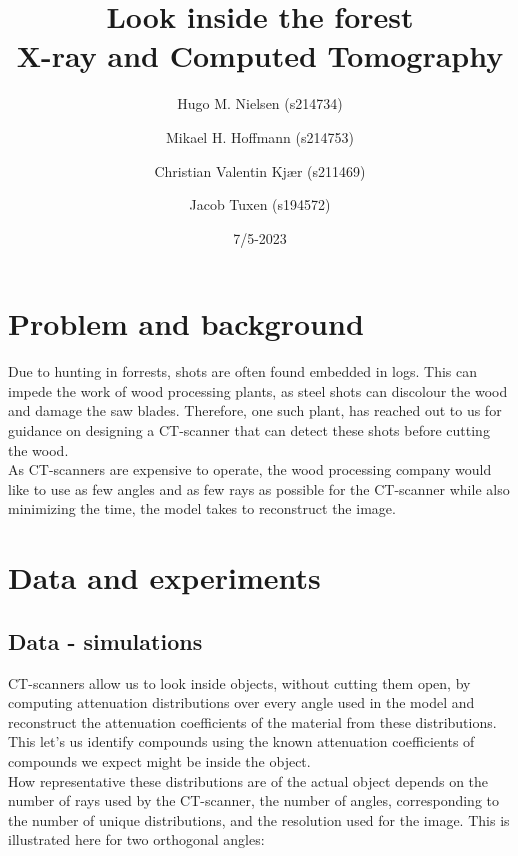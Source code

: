 \documentclass{article}
\title{
    Look inside the forest \\
    \large X-ray and Computed Tomography
}
\author{Hugo M. Nielsen (s214734) \and Mikael H. Hoffmann (s214753) \and Christian Valentin Kjær (s211469) \and Jacob Tuxen (s194572)}
\date{7/5-2023}
\begin{document}
\maketitle


\section{Problem and background} 
Due to hunting in forrests, shots are often found embedded in logs. This can impede the work of wood processing plants, as steel shots can discolour the wood and damage the saw blades. Therefore, one such plant, has reached out to us for guidance on designing a CT-scanner that can detect these shots before cutting the wood. \\
As CT-scanners are expensive to operate, the wood processing company would like to use as few angles and as few rays as possible for the CT-scanner while also minimizing the time, the model takes to reconstruct the image.


\section{Data and experiments}
\subsection{Data - simulations}
CT-scanners allow us to look inside objects, without cutting them open, by computing attenuation distributions over every angle used in the model and reconstruct the attenuation coefficients of the material from these distributions. This let's us identify compounds using the known attenuation coefficients of compounds we expect might be inside the object. \\ 
How representative these distributions are of the actual object depends on the number of rays used by the CT-scanner, the number of angles, corresponding to the number of unique distributions, and the resolution used for the image. This is illustrated here for two orthogonal angles:
\end{document}
